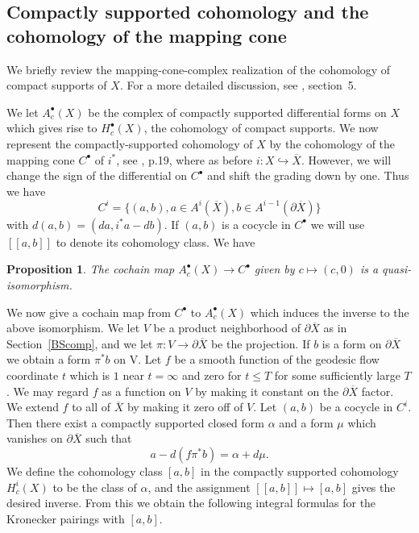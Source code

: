 \documentclass[12pt,leqno]{amsart}
\numberwithin{equation}{section}
\theoremstyle{plain}
\newtheorem{proposition}[theorem]{Proposition}
\theoremstyle{definition}
\theoremstyle{remark}
\begin{document}
\subsection{Compactly supported cohomology and the cohomology of the mapping cone}\label{mappingconesection}

We briefly review the mapping-cone-complex realization of the cohomology of compact supports of $X$. For a more detailed discussion, see \cite{FMspec}, section~5. 

We let $A_c^{\bullet}(X)$ be the complex of compactly supported differential forms on $X$ which gives rise to $H_c^{\bullet}(X)$, the cohomology of compact supports. We now represent the compactly-supported cohomology of $X$ by the cohomology of the mapping cone $C^{\bullet}$ of $i^*$, see \cite{Weibel}, p.19, where as before $i: X \hookrightarrow \overline{X}$. However, we will change the sign of the differential on $C^{\bullet}$ and shift the grading down by one. Thus we have
$$C^i =\{ (a,b), a \in A^i (\overline{X}), b \in A^{i-1}(\partial \overline{X})\}$$
with $d(a,b) = (da, i^*a - db)$.
If $(a,b)$ is a cocycle in $C^{\bullet}$ we will use $[[a,b]]$ to denote its cohomology class. We have
\begin{proposition} \label{quasiiso}
The cochain map $A_c^{\bullet}(X) \to C^{\bullet}$ given by $c \mapsto (c,0)$ is a quasi-isomorphism.
\end{proposition}

We now give a cochain map from $C^{\bullet}$ to $ A_c^{\bullet}(X)$ which induces the inverse to the above isomorphism. We let $V$ be a product neighborhood of $\partial \overline{X}$ as in Section~\ref{BScomp}, and we let $\pi:V \to \partial \overline{X}$ be the projection. If $b$ is a form on $\partial \overline{X}$ we obtain a form $\pi^{\ast} b$ on V. Let $f$ be a smooth function of the geodesic flow coordinate $t$ which is $1$ near $t=\infty$ and zero for $t \leq T$
for some sufficiently large $T$. We may regard $f$ as a function on $V$ by making it constant on the $\partial \overline{X}$ factor. We extend $f$ to all of $ \overline{X}$ by making it zero off of $V$. Let $(a,b)$ be a cocycle in $C^i$. Then there exist a compactly supported closed form $\alpha $ and a form $\mu$ which vanishes on $\partial \overline{X}$ such that
\[
a - d(f \pi^{\ast}b ) = \alpha + d\mu.
\]
We define the cohomology class $[a,b]$ in the compactly supported  cohomology $H^i_c(X)$ to be the class of $\alpha$, and the assignment $[[a,b]] \mapsto [a,b]$ gives the desired inverse. From this we obtain the  following integral formulas for the Kronecker pairings with $[a,b]$. 
\end{document}
